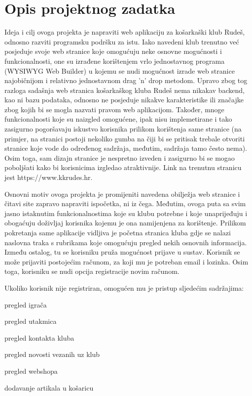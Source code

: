 \chapter{Opis projektnog zadatka}


\textnormal{Ideja i cilj ovoga projekta je napraviti web aplikaciju za košarkaški klub Rudeš, odnosno razviti programsku podršku za istu.
	Iako navedeni klub trenutno već posjeduje svoje web stranice koje omogućuju neke osnovne mogućnosti i funkcionalnosti, one su
	izrađene korištenjem vrlo jednostavnog programa (WYSIWYG Web Builder) u kojemu se nudi mogućnost izrade web stranice najobičnijom 
	i relativno jednostavnom drag 'n' drop metodom. Upravo zbog tog razloga sadašnja web stranica košarkaškog kluba Rudeš nema nikakav
	backend, kao ni bazu podataka, odnosno ne posjeduje nikakve karakteristike ili značajke zbog kojih bi se mogla nazvati pravom web 
	aplikacijom. Također, mnoge funkcionalnosti koje su naizgled omogućene, ipak nisu implemetirane i tako zasigurno pogoršavaju iskustvo 
	korisnika prilikom korištenja same stranice (na primjer, na stranici postoji nekoliko gumba na čiji bi se pritisak trebale otvoriti 
	stranice koje vode do određenog sadržaja, međutim, sadržaja tamo često nema). Osim toga, sam dizajn stranice je nespretno izveden i 
	zasigurno bi se mogao poboljšati kako bi korisnicima izgledao atraktivnije. Link na trenutnu stranicu jest https://www.kkrudes.hr.
}

\textnormal{Osnovni motiv ovoga projekta je promijeniti navedena obilježja web stranice i čitavi site zapravo napraviti ispočetka, ni iz čega.
	Međutim, ovoga puta sa svim jasno istaknutim funkcionalnostima koje su klubu potrebne i koje unaprijeđuju i obogaćuju doživljaj
	korisnika kojemu je ona namijenjena za korištenje.
	Prilikom pokretanja same aplikacije vidljiva je početna stranica kluba gdje se nalazi naslovna traka s rubrikama koje omogućuju 
	pregled nekih osnovnih informacija. Između ostalog, tu se korisniku pruža mogućnost prijave u sustav. Korisnik se može prijaviti 
	postojećim računom, za koji mu je potreban email i lozinka. Osim toga, korisniku se nudi opcija registracije novim računom.}

\textnormal{Ukoliko korisnik nije registriran, omogućen mu je pristup sljedećim sadržajima:}
\begin{packed_item}
	\item pregled igrača
	\item pregled utakmica
	\item pregled kontakta kluba
	\item pregled novosti vezanih uz klub
	\item pregled webshopa
	\item dodavanje artikala u košaricu
\end{packed_item}

